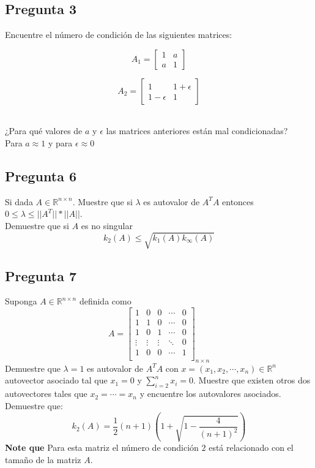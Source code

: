 \documentclass{article}
\def\R{\mbox{\(\mathbb{R}\)}}
\begin{document}
\subsection*{Pregunta 3}
Encuentre el número de condición de las siguientes matrices:\\
\begin{figure}[h!]
\begin{minipage}{4cm}
\center
$$
A_1 =  
\begin{bmatrix}
1 & a\\
a & 1
\end{bmatrix}$$
\end{minipage}
\begin{minipage}{4cm}
$$A_2 =
\begin{bmatrix}
1 & 1 + \epsilon\\
1 - \epsilon & 1
\end{bmatrix}$$
\end{minipage}
\end{figure}
\\
¿Para qué valores de $a$ y $\epsilon$ las matrices anteriores están mal condicionadas?\\
Para $a\approx 1$ y para $\epsilon \approx 0$
\subsection*{Pregunta 6}
Si dada $A \in \mathbb{R}^{n\times n}$. Muestre que si $\lambda$ es autovalor de $A^{T}A$ entonces $0\leq \lambda\leq ||A^{T}||* ||A||$.\\
Demuestre que si $A$ es no singular
$$k_2(A) \leq \sqrt{k_1(A)k_\infty(A)} $$
\subsection*{Pregunta 7}
Suponga $A \in \mathbb{R}^{n\times n}$ definida como
$$A =
\begin{bmatrix}
1&0&0&\cdots &0\\
1&1&0&\cdots &0\\
1&0&1&\cdots &0\\
\vdots&\vdots&\vdots&\ddots& 0\\
1&0&0&\cdots &1\\
\end{bmatrix}_{n\times n}
$$
Demuestre que $\lambda =1$ es autovalor de $A^{T}A$ con $x = (x_1, x_2, \cdots, x_n)\in \R^n$ autovector asociado tal que $x_1 = 0$ y $\sum_{i=2}^{n}x_i = 0$. Muestre que existen otros dos autovectores tales que $x_2 = \cdots = x_n$ y encuentre los autovalores asociados. Demuestre que:
$$ k_2(A) = \frac{1}{2}(n+1)\left(1+\sqrt{1-\frac{4}{(n+1)^{2}}}\right)$$
{\bf Note que} Para esta matriz el número de condición $2$ está relacionado con el tamaño de la matriz $A$.
\end{document}
